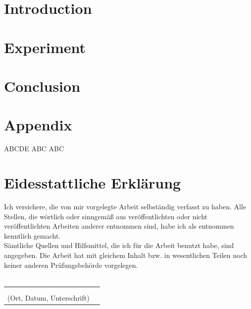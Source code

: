 \documentclass[a4paper,12pt,oneside]{article}
\begin{document}
    \newpage
    

    \tableofcontents
    
    \newpage
    \pagestyle{fancy}
    
    
    \listoffigures
    \newpage
    
    \listoftables
    \newpage
    
  
    
    \section{Introduction}\label{introduction}  
     
    \newpage

    \section{Experiment}
    
    \newpage
    
    \section{Conclusion}\label{conclusion}  
     
    
    

    \newpage
    \setcounter{section}{0} 
    \renewcommand*\thesection{\Alph{section}}
    \section{Appendix}\label{appendix}
    
        ABCDE
    \newpage
        ABC
    \newpage
        ABC
    \newpage
    
    
    \pagestyle{empty}
    \section{Eidesstattliche Erklärung}
    
    Ich versichere, die von mir vorgelegte Arbeit selbständig verfasst zu haben.
    Alle Stellen, die wörtlich oder sinngemäß aus veröffentlichten oder nicht veröffentlichten Arbeiten anderer entnommen sind,
    habe ich als entnommen kenntlich gemacht.\\ 
    Sämtliche Quellen und Hilfsmittel, die ich für die Arbeit benutzt habe, sind
    angegeben. Die Arbeit hat mit gleichem Inhalt bzw. in wesentlichen Teilen noch keiner anderen Prüfungsbehörde vorgelegen.\\\\
    \begin{tabular}{cp{7cm}}
    & \\ 
    & \\ \hline
    \small (Ort, Datum, Unterschrift) & \normalsize \\
    \end{tabular}
    
    
    \newpage
    \printbibliography

    \thispagestyle{empty}
    \newpage
\end{document}
